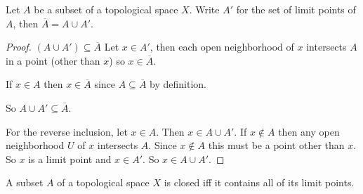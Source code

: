\documentclass[12pt, twosided]{article}
\begin{document}
  \begin{thm}
    Let \(A\) be a subset of a topological space \(X\). Write \(A\prime\) for the set of limit points of \(A\), then \(\overline{A} = A \cup A\prime\).
  \end{thm}

  \begin{proof}

    \((A \cup A\prime) \subseteq \overline{A}\) Let \(x \in A\prime\), then each open neighborhood of \(x\) intersects \(A\) in a point (other than \(x\)) so \(x \in \overline{A}\).

    If \(x \in A\) then \(x \in \overline{A}\) since \(A \subseteq \overline{A}\) by definition.
    
    So \(A \cup A\prime \subseteq \overline{A}\).

    For the reverse inclusion, let \(x \in A\). Then \(x \in A \cup A\prime\). If \(x \not\in A\) then any open neighborhood \(U\) of \(x\) intersects \(A\). Since \(x \not\in A\) this must be a point other than \(x\). So \(x\) is a limit point and \(x \in A\prime\). So \(x \in A \cup A\prime\). 
  \end{proof}

  \begin{cor}
    A subset \(A\) of a topological space \(X\) is closed iff it contains all of its limit points.
  \end{cor}
\end{document}
